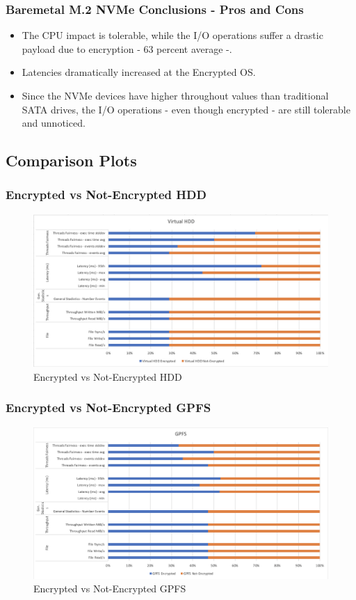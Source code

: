 \newpage
\subsubsection{Baremetal M.2 NVMe Conclusions - Pros and Cons}
\begin{itemize}
  \item The CPU impact is tolerable, while the I/O operations suffer a drastic payload due to encryption - 63 percent average -. 
  \item Latencies dramatically increased at the Encrypted OS.
  \item Since the NVMe devices have higher throughout values than traditional SATA drives, the I/O operations - even though encrypted - are still tolerable and unnoticed.
\end{itemize}

\newpage
\subsection{Comparison Plots}
\subsubsection{Encrypted vs Not-Encrypted HDD}
\begin{figure}
  \includegraphics[width=15cm]{images/image7.png}
  \centering
  \caption{Encrypted vs Not-Encrypted HDD}
\end{figure}
\subsubsection{Encrypted vs Not-Encrypted GPFS}
\begin{figure}
  \includegraphics[width=15cm]{images/image8.png}
  \centering
  \caption{Encrypted vs Not-Encrypted GPFS}
\end{figure}
\newpage
